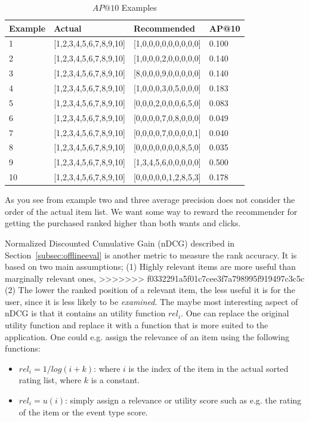 \begin{table}[H]
\label{table:ap}
\centering
\begin{tabular}{*{4}l}
\toprule
Example 	& 	Actual					& 	Recommended					&	AP@10   \\ \midrule
1			& [1,2,3,4,5,6,7,8,9,10]	&	[1,0,0,0,0,0,0,0,0,0]		&	0.100  \\
2			& [1,2,3,4,5,6,7,8,9,10]	&	[1,0,0,0,2,0,0,0,0,0]		&	0.140  \\
3			& [1,2,3,4,5,6,7,8,9,10]	&	[8,0,0,0,9,0,0,0,0,0]		&	0.140  \\
4			& [1,2,3,4,5,6,7,8,9,10]	&	[1,0,0,0,3,0,5,0,0,0]		&	0.183  \\
5			& [1,2,3,4,5,6,7,8,9,10]	&	[0,0,0,2,0,0,0,6,5,0]		&	0.083  \\
6			& [1,2,3,4,5,6,7,8,9,10]	&	[0,0,0,0,7,0,8,0,0,0]		&	0.049  \\
7			& [1,2,3,4,5,6,7,8,9,10]	&	[0,0,0,0,7,0,0,0,0,1]		&	0.040  \\
8			& [1,2,3,4,5,6,7,8,9,10]	&	[0,0,0,0,0,0,0,8,5,0]		&	0.035  \\
9			& [1,2,3,4,5,6,7,8,9,10]	&	[1,3,4,5,6,0,0,0,0,0]		&	0.500  \\
10			& [1,2,3,4,5,6,7,8,9,10]	&	[0,0,0,0,0,1,2,8,5,3]		&	0.178  \\
\bottomrule
\end{tabular}
\caption{$AP@10$ Examples}
\end{table}

As you see from example two and three average precision does not consider the order of the actual item list. We want some way to
reward the recommender for getting the purchased ranked higher than both wants and clicks.

Normalized Discounted Cumulative Gain (nDCG) described in Section~\ref{subsec:offlineeval} is another metric to
measure the rank accuracy. It is based on two main assumptions; (1) Highly relevant items are more useful than marginally relevant ones,
>>>>>>> f0332291a5f01c7cee3f7a798995f919497c3c5c
(2) The lower the ranked position of a relevant item, the less useful it is for the user, since it is less likely to be \emph{examined}.
The maybe most interesting aspect of nDCG is that it contains an utility function $rel_i$. One can replace the original utility function
and replace it with a function that is more suited to the application. One could e.g. assign the relevance of an item using
the following functions:

\begin{itemize}
\item $rel_i = 1/log(i+k)$: where $i$ is the index of the item in the actual sorted rating list, where $k$ is a constant.
\item $rel_i = u(i)$: simply assign a relevance or utility score such as e.g. the rating of the item or the event type score.
\end{itemize}

